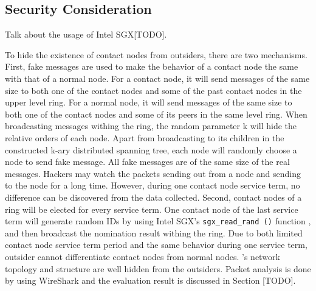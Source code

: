 \subsection{Security Consideration} \label{security}

Talk about the usage of Intel SGX[TODO].

To hide the existence of \xxx contact nodes from outsiders, there are two mechanisms. First, fake messages are used to make the behavior of a contact node the same with that of a normal node. For a contact node, it will send messages of the same size to both one of the contact nodes and some of the past contact nodes in the upper level ring. For a normal node, it will send messages of the same size to both one of the contact nodes and some of its peers in the same level ring. When broadcasting messages withing the ring, the random parameter k will hide the relative orders of each node. Apart from broadcasting to its children in the constructed k-ary distributed spanning tree, each node will randomly choose a node to send fake message. All fake messages are of the same size of the real messages. Hackers may watch the packets sending out from a node and sending to the node for a long time. However, during one contact node service term, no difference can be discovered from the data collected. Second, contact nodes of a ring will be elected for every service term. One contact node of the last service term will generate random IDs by using Intel SGX's \texttt{sgx\_read\_rand ()} function \cite{costan2016intel}, and then broadcast the nomination result withing the ring. Due to both limited contact node service term period and the same behavior during one service term, outsider cannot differentiate contact nodes from normal nodes. \xxx's network topology and structure are well hidden from the outsiders. Packet analysis is done by using WireShark and the evaluation result is discussed in Section [TODO].